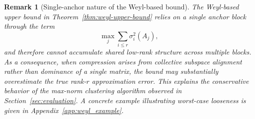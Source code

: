 \documentclass[10pt]{article} %
\def\eqref#1{equation~\ref{#1}}
\newtheorem{remark}{Remark}
\begin{document}

\begin{remark}[Single-anchor nature of the Weyl-based bound]
\label{rem:weyl_anchor}
The Weyl-based upper bound in Theorem~\ref{thm:weyl-upper-bound} relies on a \emph{single anchor block} through the term
\[
\max_{j} \sum_{i\le r} \sigma_i^2(A_j),
\]
and therefore cannot accumulate shared low-rank structure across multiple blocks.
As a consequence, when compression arises from collective subspace alignment rather than dominance of a single matrix, the bound may substantially overestimate the true rank-$r$ approximation error.
This explains the conservative behavior of the max-norm clustering algorithm observed in Section~\ref{sec:evaluation}.
A concrete example illustrating worst-case looseness is given in Appendix~\ref{app:weyl_example}.
\end{remark}
\end{document}
